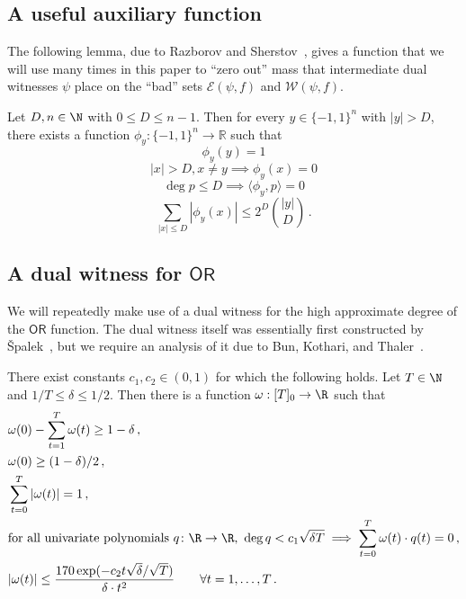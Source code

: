 \documentclass{toc}
\newcommand{\OR}{\mathsf{ OR}}
\newcommand{\bits}{\{-1,1\}}
\begin{document}
\subsection{A useful auxiliary function}
The following lemma, due to Razborov and Sherstov~\cite{razborovsherstov}, gives a function that we will use
many times in this paper to ``zero out'' mass that intermediate dual witnesses $\psi$ place
on the ``bad'' sets $\mathcal{E}(\psi, f)$ and $\mathcal{W}(\psi, f)$. 

\begin{lemma}\label{lem:rs}
	Let $D, n \in \N$ with $0 \le D \le n - 1$. Then for every $y \in \bits^n$ with $|y| > D$, there exists a function $\phi_y: \bits^n \to \mathbb{R}$ such that
	\begin{equation}\phi_y(y) = 1	\label{eqn:rs-point}\end{equation}
	\begin{equation}|x| > D, x \ne y \implies \phi_y(x) = 0	\label{eqn:rs-hamming}\end{equation}
	\begin{equation}\deg p \le D \implies \langle \phi_y, p \rangle = 0 \label{eqn:rs-phd} \end{equation}
	\begin{equation}\sum_{|x| \le D} |\phi_y(x)| \le 2^D {|y| \choose D}\,.   \label{eqn:rs-norm} \end{equation}
\end{lemma}
%

\subsection{A dual witness for \texorpdfstring{$\OR$}{OR}}
We will repeatedly make use of a dual witness for the high approximate
degree of the $\OR$ function. The dual witness itself was essentially first constructed by {\v S}palek~\cite{spalek}, 
but we require an analysis of it due to Bun, Kothari, and Thaler~\cite{bkt}.

\begin{proposition} \label{prop:or-sym-dual}  %
	There exist constants $c_1, c_2 \in (0, 1) $ for which the following holds. Let $T \in \N$ and $1/T \le \delta \le 1/2$. Then there is a function $\omega : [T]_0 \to \R$ such that
	\begin{align}
	&\omega(0) - \sum_{t = 1}^T \omega(t) \ge 1- \delta\,,  \label{eqn:or-sym-corr}\\
	& \omega(0) \ge (1-\delta)/2\,,\\
	  &\sum_{t = 0}^T |\omega(t)| = 1\,, \\
%
	& \text{for all univariate polynomials } q \colon \R \to \R\text{, } \deg q < c_1\sqrt{\delta T} \implies \sum_{t=0}^T \omega(t) \cdot q(t) = 0\,, \label{eqn:or-sym-phd}\\
	& |\omega(t)| \le \frac{170 \exp(-c_2 t \sqrt{\delta} /  \sqrt{T})}{\delta \cdot t^2} \qquad \forall t = 1, \dots, T\,.\label{eqn:or-sym-decay}\end{align}
\end{proposition}
\end{document}
